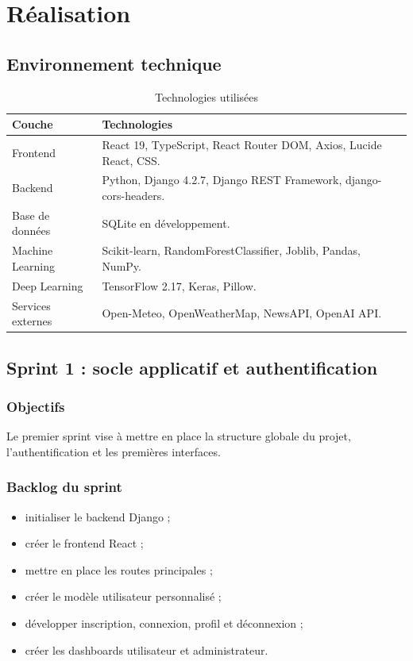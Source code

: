 \chapter{Réalisation}

\section{Environnement technique}
\begin{table}[H]
\centering
\caption{Technologies utilisées}
\begin{tabular}{p{4cm}p{9cm}}
\toprule
\textbf{Couche} & \textbf{Technologies} \\
\midrule
Frontend & React 19, TypeScript, React Router DOM, Axios, Lucide React, CSS. \\
Backend & Python, Django 4.2.7, Django REST Framework, django-cors-headers. \\
Base de données & SQLite en développement. \\
Machine Learning & Scikit-learn, RandomForestClassifier, Joblib, Pandas, NumPy. \\
Deep Learning & TensorFlow 2.17, Keras, Pillow. \\
Services externes & Open-Meteo, OpenWeatherMap, NewsAPI, OpenAI API. \\
\bottomrule
\end{tabular}
\end{table}

\section{Sprint 1 : socle applicatif et authentification}
\subsection{Objectifs}
Le premier sprint vise à mettre en place la structure globale du projet, l'authentification et les premières interfaces.

\subsection{Backlog du sprint}
\begin{itemize}[noitemsep]
  \item initialiser le backend Django ;
  \item créer le frontend React ;
  \item mettre en place les routes principales ;
  \item créer le modèle utilisateur personnalisé ;
  \item développer inscription, connexion, profil et déconnexion ;
  \item créer les dashboards utilisateur et administrateur.
\end{itemize}

